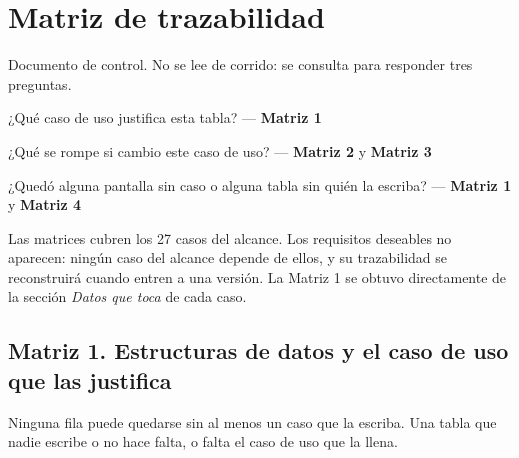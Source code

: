 \section*{Matriz de trazabilidad}

Documento de control. No se lee de corrido: se consulta para responder tres preguntas.

\begin{flujo}
  \item ¿Qué caso de uso justifica esta tabla? — \textbf{Matriz 1}
  \item ¿Qué se rompe si cambio este caso de uso? — \textbf{Matriz 2} y \textbf{Matriz 3}
  \item ¿Quedó alguna pantalla sin caso o alguna tabla sin quién la escriba? — \textbf{Matriz 1} y \textbf{Matriz 4}
\end{flujo}

Las matrices cubren los 27 casos del alcance. Los requisitos deseables no aparecen: ningún caso del alcance depende de ellos, y su trazabilidad se reconstruirá cuando entren a una versión. La Matriz 1 se obtuvo directamente de la sección \textit{Datos que toca} de cada caso.

\subsection*{Matriz 1. Estructuras de datos y el caso de uso que las justifica}
Ninguna fila puede quedarse sin al menos un caso que la escriba. Una tabla que nadie escribe o no hace falta, o falta el caso de uso que la llena.

